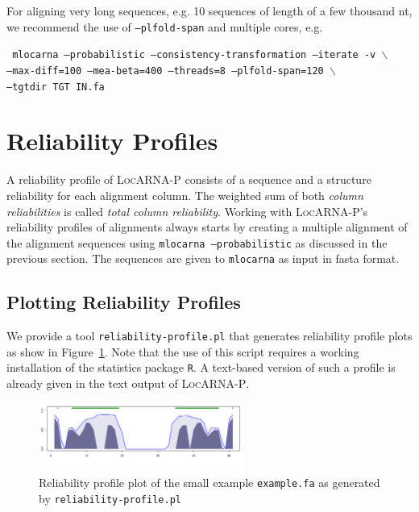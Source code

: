 \documentclass{article}
\newcommand{\LocARNAP}{\textsc{LocARNA-P}}
\newenvironment{ttbox}{%
  \begin{framed}\begin{minipage}{1.0\textwidth}\tt}%
{\end{minipage}\end{framed}}
\begin{document}
For aligning very long sequences, e.g. 10 sequences of length of a few
thousand nt, we recommend the use of \texttt{--plfold-span} and
multiple cores, e.g.
\begin{ttbox}
  mlocarna --probabilistic --consistency-transformation --iterate -v $\backslash$ \\
  \hphantom{mlocarna}  --max-diff=100 --mea-beta=400 --threads=8 --plfold-span=120 $\backslash$ \\
  \hphantom{mlocarna} --tgtdir TGT IN.fa
\end{ttbox}

\section{Reliability Profiles}

A reliability profile of \LocARNAP{} consists of a sequence and a
structure reliability for each alignment column. The weighted sum of
both \emph{column reliabilities} is called \emph{total column
  reliability}.  Working with \LocARNAP's reliability profiles of
alignments always starts by creating a multiple alignment of the
alignment sequences using \texttt{mlocarna --probabilistic} as
discussed in the previous section. The sequences are given to
\texttt{mlocarna} as input in fasta format.

\subsection{Plotting Reliability Profiles}

We provide a tool \texttt{reliability-profile.pl} that generates
reliability profile plots as show in Figure~\ref{fig:relprof}. Note
that the use of this script requires a working installation of the
statistics package \texttt{R}. A text-based version of such a profile
is already given in the text output of \LocARNAP{}.

\begin{figure}[h]
  \centering
  \includegraphics[width=0.6\textwidth]{Figs/relprof.pdf}
  \caption{Reliability profile plot of the small example
    \texttt{example.fa} as generated by
    \texttt{reliability-profile.pl}}
  \label{fig:relprof}
\end{figure}
\end{document}
